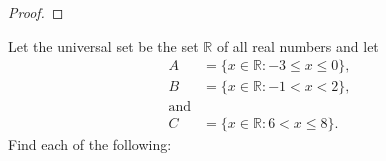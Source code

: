\documentclass[12pt,letterpaper, onecolumn]{exam}
\begin{document}
\begin{questions}
\begin{solution}
\begin{parts}
\begin{proof}
			\end{proof}
		\end{parts}
	\end{solution}
	\setcounter{question}{11}\question Let the universal set be the set $\mathbb{R}$ of all real numbers and let 
	 \begin{align*}
		A&=\{x\in\mathbb{R}:-3\leq x \leq 0\},\\
		B&=\{x\in\mathbb{R}:-1<x<2\},\\
		\text{and}\\
		C&=\{x\in\mathbb{R}:6<x\leq8\}.
	\end{align*}
	Find each of the following:
	\begin{solution}
		\begin{parts}

\end{parts}
\end{solution}
\end{questions}
\end{document}
